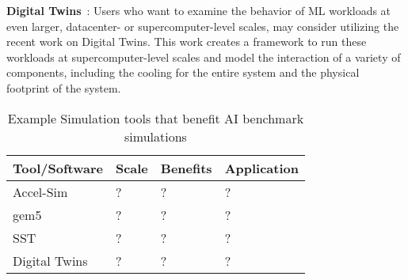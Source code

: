 \noindent
\textbf{Digital Twins}~\cite{brewer2024digital}: Users who want to examine the behavior of ML workloads at even larger, datacenter- or supercomputer-level scales, may consider utilizing the recent work on Digital Twins.
This work creates a framework to run these workloads at supercomputer-level scales and model the interaction of a variety of components, including the cooling for the entire system and the physical footprint of the system.


\begin{table}[htb]
\caption{Example Simulation tools that benefit AI benchmark simulations }
\begin{center}
\begin{tabular}{llll}
Tool/Software & Scale & Benefits & Application \\
\hline
Accel-Sim \cite{KhairyShen2021-accelSim}& ? & ? & ?\\ 
gem5 \cite{binkert2011gem5, LowePowerAhmad2020-gem520} & ? & ? & ?\\ 
SST \cite{RodriguesHemmert2011-sst, SST} & ? & ? & ?\\ 
Digital Twins \cite{brewer2024digital} & ? & ? & ?\\ 
\end{tabular}
\end{center}
\end{table}